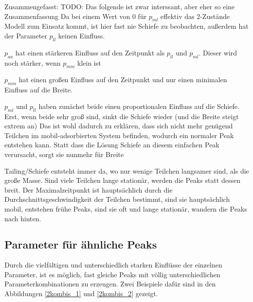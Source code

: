 Zusammengefasst: 
TODO: Das folgende ist zwar interssant, aber eher so eine Zusammenfassung
Da bei einem Wert von $0$ für $p_{ml}$ effektiv das 2-Zustände Modell zum Einsatz kommt, ist hier fast nie Schiefe zu beobachten, außerdem hat der Parameter $p_{ll}$ keinen Einfluss. 

$p_{aa}$ hat einen stärkeren Einfluss auf den Zeitpunkt als $p_{ll}$ und $p_{ml}$. Dieser wird noch stärker, wenn $p_{mm}$ klein ist

$p_{mm}$ hat einen großen Einfluss auf den Zeitpunkt und nur einen minimalen Einfluss auf die Breite.

$p_{ml}$ und $p_{ll}$ haben zunächst beide einen proportionalen Einfluss auf die Schiefe. Erst, wenn beide sehr groß sind, sinkt die Schiefe wieder (und die Breite steigt extrem an) Das ist wohl dadurch zu erklären, dass sich nicht mehr genügend Teilchen im mobil-adsorbierten System befinden, wodurch ein normaler Peak entstehen kann. Statt dass die Lösung Schiefe an diesem einfachen Peak verursacht, sorgt sie nunmehr für Breite

Tailing/Schiefe entsteht immer da, wo nur wenige Teilchen langsamer sind, als die große Masse. Sind viele Teilchen lange stationär, werden die Peaks statt dessen breit. Der Maximalzeitpunkt ist hauptsächlich durch die Durchschnittsgeschwindigkeit der Teilchen bestimmt, sind sie hauptsächlich mobil, entstehen frühe Peaks, sind sie oft und lange stationär, wandern die Peaks nach hinten.


\subsection{Parameter für ähnliche Peaks}
\label{chapter:eva_gleichePeaks}

Durch die vielfältigen und unterschiedlich starken Einflüsse der einzelnen Parameter, ist es möglich, fast gleiche Peaks mit völlig unterschiedlichen Parameterkombinationen zu erzeugen. Zwei Beispiele dafür sind in den Abbildungen \ref{2kombis_1} und \ref{2kombis_2} gezeigt.

